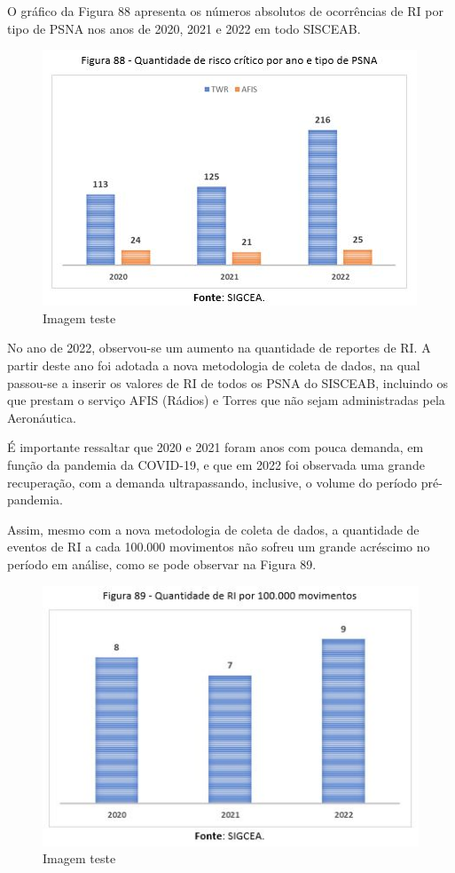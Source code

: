 \documentclass[
]{book}
\begin{document}
O gráfico da Figura 88 apresenta os números absolutos de ocorrências de RI por tipo de PSNA nos anos de 2020, 2021 e 2022 em todo SISCEAB.

\begin{figure}
\centering
\includegraphics{imagens/fig75.jpg}
\caption{Imagem teste}
\end{figure}

No ano de 2022, observou-se um aumento na quantidade de reportes de RI. A partir deste ano foi adotada a nova metodologia de coleta de dados, na qual passou-se a inserir os valores de RI de todos os PSNA do SISCEAB, incluindo os que prestam o serviço AFIS (Rádios) e Torres que não sejam administradas pela Aeronáutica.

É importante ressaltar que 2020 e 2021 foram anos com pouca demanda, em função da pandemia da COVID-19, e que em 2022 foi observada uma grande recuperação, com a demanda ultrapassando, inclusive, o volume do período pré-pandemia.

Assim, mesmo com a nova metodologia de coleta de dados, a quantidade de eventos de RI a cada 100.000 movimentos não sofreu um grande acréscimo no período em análise, como se pode observar na Figura 89.

\begin{figure}
\centering
\includegraphics{imagens/fig76.jpg}
\caption{Imagem teste}
\end{figure}
\end{document}
